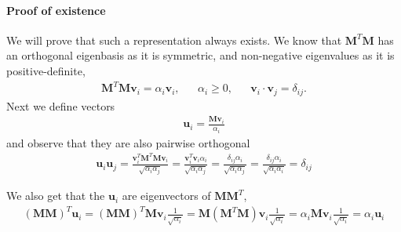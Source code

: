     \paragraph{Proof of existence}
    We will prove that such a representation always exists.
    We know that $\bm{M}^T \bm{M}$ has an orthogonal eigenbasis as it is symmetric, and non-negative eigenvalues as it is positive-definite,
    \begin{align}
        \bm{M}^T \bm{M} \bm{v}_i = \alpha_i \bm{v}_i, && \alpha_i \geq 0, &&  \bm{v}_i \cdot \bm{v}_j = \delta_{ij}.
    \end{align}
    Next we define vectors 
    \begin{align}
    \bm{u}_i = \frac{\bm{Mv}_i}{\alpha_i}    
    \end{align}
    and observe that they are also pairwise orthogonal
    \begin{align}
        \bm{u}_i \bm{u}_j = \frac{\bm{v}_i^T \bm{M}^T \bm{Mv}_i}{\sqrt{\alpha_i \alpha_j}} = \frac{\bm{v}_i^T \bm{v}_i \alpha_i}{{\sqrt{\alpha_i \alpha_j}}} = 
        \frac{\delta_{ij} \alpha_i}{{\sqrt{\alpha_i \alpha_j}}} = 
        \frac{\delta_{ij} \alpha_i}{{\sqrt{\alpha_i \alpha_i}}} = \delta_{ij}
    \end{align}
    
    We also get that the $\bm{u}_i$ are eigenvectors of $\bm{MM}^T$, 
    \begin{align}
         (\bm{M}\bm{M})^T \bm{u}_i
        =(\bm{M}\bm{M})^T \bm{Mv}_i \frac{1}{\sqrt{\alpha_i}} 
        =\bm{M}(\bm{M}^T \bm{M}) \bm{v}_i \frac{1}{\sqrt{\alpha_i}} 
        = \alpha_i \bm{M} \bm{v}_i  \frac{1}{\sqrt{\alpha_i}} 
        = \alpha_i \bm{u}_i
    \end{align}
    
